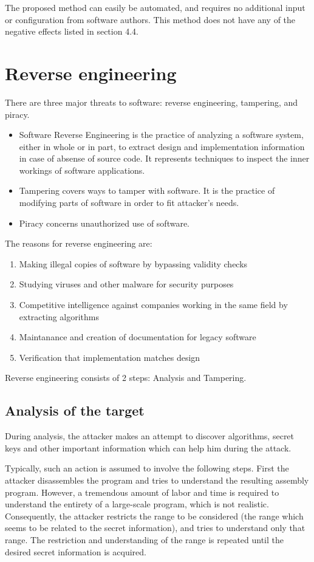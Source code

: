 \documentclass[a4paper,12pt]{article}
\begin{document}
The proposed method can easily be automated, and requires no additional input
or configuration from software authors. This method does not have any of the
negative effects listed in section 4.4.

\section{Reverse engineering}

There are three major threats to software: reverse engineering, tampering, and
piracy.

\begin{itemize}
\item Software Reverse Engineering is the practice of analyzing a software
    system, either in whole or in part, to extract design and implementation
    information in case of absense of source code. It represents techniques to
    inspect the inner workings of software applications.
\item Tampering covers ways to tamper with software. It is the practice of
    modifying parts of software in order to fit attacker's needs.
\item Piracy concerns unauthorized use of software.
\end{itemize}

The reasons for reverse engineering are:
\begin{enumerate}
\item Making illegal copies of software by bypassing validity checks
\item Studying viruses and other malware for security purposes
\item Competitive intelligence against companies working in the same field
    by extracting algorithms
\item Maintanance and creation of documentation for legacy software
\item Verification that implementation matches design
\end{enumerate}

Reverse engineering consists of 2 steps: Analysis and Tampering.

\subsection{Analysis of the target}
During analysis, the attacker makes an attempt to discover algorithms, secret keys and other important information which can help him during the attack.

Typically, such an action is assumed to involve the following steps. First the
attacker disassembles the program and tries to understand the resulting
assembly program. However, a tremendous amount of labor and time is required
to understand the entirety of a large-scale program, which is not realistic.
Consequently, the attacker restricts the range to be considered (the range
which seems to be related to the secret information), and tries to understand
only that range. The restriction and understanding of the range is repeated
until the desired secret information is acquired.
\end{document}
